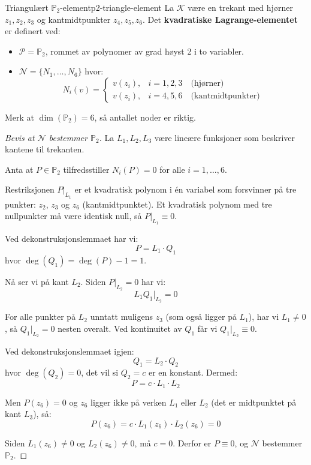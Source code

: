 \documentclass[../../main.tex]{subfiles}
\begin{document}
\begin{example}{Triangulært $\mathbb{P}_2$-element}{p2-triangle-element}
La $\mathcal{K}$ være en trekant med hjørner $z_1, z_2, z_3$ og kantmidtpunkter $z_4, z_5, z_6$. Det \textbf{kvadratiske Lagrange-elementet} er definert ved:
\begin{itemize}
    \item $\mathcal{P} = \mathbb{P}_2$, rommet av polynomer av grad høyst 2 i to variabler.
    \item $\mathcal{N} = \{N_1, \ldots, N_6\}$ hvor:
    \[
        N_i(v) =
        \begin{cases}
            v(z_i), & i = 1, 2, 3 \quad \text{(hjørner)} \\
            v(z_i), & i = 4, 5, 6 \quad \text{(kantmidtpunkter)}
        \end{cases}
    \]
\end{itemize}
Merk at $\dim(\mathbb{P}_2) = 6$, så antallet noder er riktig.
\end{example}

\begin{center}
    
\end{center}

\begin{proof}[Bevis at $\mathcal{N}$ bestemmer $\mathbb{P}_2$]
La $L_1, L_2, L_3$ være lineære funksjoner som beskriver kantene til trekanten.

Anta at $P \in \mathbb{P}_2$ tilfredsstiller $N_i(P) = 0$ for alle $i = 1, \ldots, 6$.

Restriksjonen $P|_{L_1}$ er et kvadratisk polynom i én variabel som forsvinner på tre punkter: $z_2$, $z_3$ og $z_6$ (kantmidtpunktet). Et kvadratisk polynom med tre nullpunkter må være identisk null, så $P|_{L_1} \equiv 0$.

Ved dekonstruksjonslemmaet har vi:
\[
    P = L_1 \cdot Q_1
\]
hvor $\deg(Q_1) = \deg(P) - 1 = 1$.

Nå ser vi på kant $L_2$. Siden $P|_{L_2} = 0$ har vi:
\[
    L_1 Q_1|_{L_2} = 0
\]

For alle punkter på $L_2$ unntatt muligens $z_3$ (som også ligger på $L_1$), har vi $L_1 \neq 0$, så $Q_1|_{L_2} = 0$ nesten overalt. Ved kontinuitet av $Q_1$ får vi $Q_1|_{L_2} \equiv 0$.

Ved dekonstruksjonslemmaet igjen:
\[
    Q_1 = L_2 \cdot Q_2
\]
hvor $\deg(Q_2) = 0$, det vil si $Q_2 = c$ er en konstant. Dermed:
\[
    P = c \cdot L_1 \cdot L_2
\]

Men $P(z_6) = 0$ og $z_6$ ligger ikke på verken $L_1$ eller $L_2$ (det er midtpunktet på kant $L_3$), så:
\[
    P(z_6) = c \cdot L_1(z_6) \cdot L_2(z_6) = 0
\]

Siden $L_1(z_6) \neq 0$ og $L_2(z_6) \neq 0$, må $c = 0$. Derfor er $P \equiv 0$, og $\mathcal{N}$ bestemmer $\mathbb{P}_2$.
\end{proof}
\end{document}
